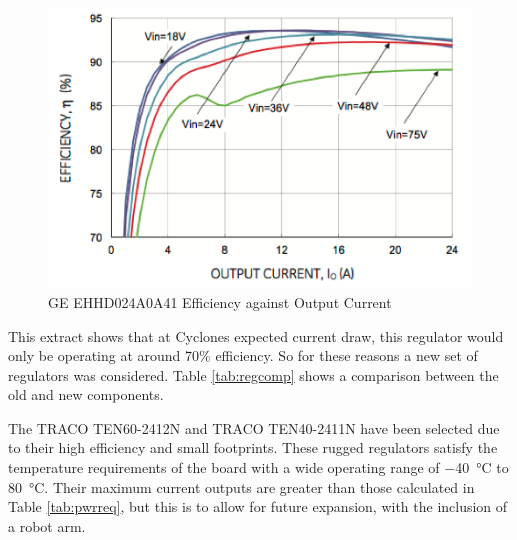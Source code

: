 \begin{figure}[ht]
\centering\includegraphics[width=0.8\linewidth]
{Images/ElectronicsFigures/RegulatorsGraph.png}
\caption{GE EHHD024A0A41 Efficiency against Output Current}
\label{fig:old5vg}
\end{figure}

This extract shows that at Cyclones expected current draw, this regulator would only be operating at around 70\% efficiency. So for these reasons a new set of regulators was considered. Table \ref{tab:regcomp} shows a comparison between the old and new components.\par

\begin{table}[ht]
\caption{Regulators Comparison between Orion and Cyclone}
\label{tab:regcomp}
\end{table}


The TRACO TEN60-2412N and TRACO TEN40-2411N have been selected due to their high efficiency and small footprints. These rugged regulators satisfy the temperature requirements of the board with a wide operating range of \SI{-40}{\degree}C to \SI{+80}{\degree}C. Their maximum current outputs are greater than those calculated in Table \ref{tab:pwrreq}, but this is to allow for future expansion, with the inclusion of a robot arm.\par

